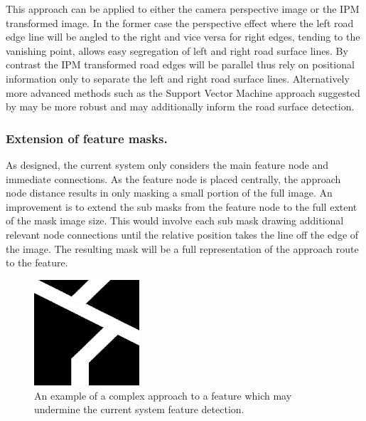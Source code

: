 \documentclass[]{aiaa-tc}%
\begin{document}
This approach can be applied to either the camera perspective image or the IPM transformed image. In the former case the perspective effect where the left road edge line will be angled to the right and vice versa for right edges, tending to the vanishing point, allows easy segregation of left and right road surface lines. By contrast the IPM transformed road edges will be parallel thus rely on positional information only to separate the left and right road surface lines. Alternatively more advanced methods such as the Support Vector Machine approach suggested by \citet{moncularLaneDetectAndTrack} may be more robust and may additionally inform the road surface detection.



\subsubsection{Extension of feature masks.} As designed, the current system only considers the main feature node and immediate connections. As the feature node is placed centrally, the approach node distance results in only masking a small portion of the full image. An improvement is to extend the sub masks from the feature node to the full extent of the mask image size. This would involve each sub mask drawing additional relevant node connections until the relative position takes the line off the edge of the image. The resulting mask will be a full representation of the approach route to the feature.

\begin{figure} %
	\centering
	\includegraphics[width=0.35\textwidth]{complexFeatureApproach.png}
	\caption{An example of a complex approach to a feature which may undermine the current system feature detection.}
	\label{f:complexFeatureApproach}
\end{figure}
\end{document}
